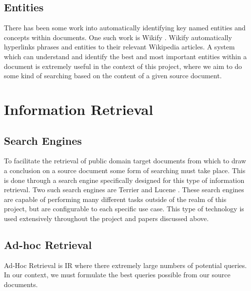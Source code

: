 \documentclass{l4proj}
\begin{document}
\subsection{Entities}
There has been some work into automatically identifying key named entities and concepts within documents. One such work is Wikify \cite{Mihalcea:2007:WLD:1321440.1321475}. Wikify automatically hyperlinks phrases and entities to their relevant Wikipedia articles. A system which can understand and identify the best and most important entities within a document is extremely useful in the context of this project, where we aim to do some kind of searching based on the content of a given source document.

\section{Information Retrieval}
\subsection{Search Engines}
To facilitate the retrieval of public domain target documents from which to draw a conclusion on a source document some form of searching must take place. This is done through a search engine specifically designed for this type of information retrieval. Two such search engines are Terrier and Lucene \cite{macdonald2012puppy} \cite{terrier} \cite{lucene}. These search engines are capable of performing many different tasks outside of the realm of this project, but are configurable to each specific use case. This type of technology is used extensively throughout the project and papers discussed above.

\subsection{Ad-hoc Retrieval}
Ad-Hoc Retrieval is IR where there extremely large numbers of potential queries. In our context, we must formulate the best queries possible from our source documents.
\end{document}

